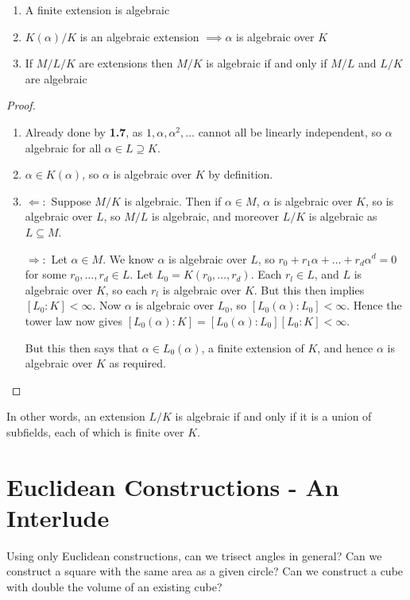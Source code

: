 \documentclass[10pt,a4paper]{article}
\begin{document}
\begin{proposition}
\item
\begin{enumerate}
\item A finite extension is algebraic
\item $K(\alpha) / K$ is an algebraic extension $\implies \alpha$ is algebraic over $K$
\item If $M/L/K$ are extensions then $M/K$ is algebraic if and only if $M/L$ and $L/K$ are algebraic
\end{enumerate}
\end{proposition}
\begin{proof}
\item
\begin{enumerate}
\item Already done by \textbf{1.7}, as $1, \alpha, \alpha^2, \ldots$ cannot all be linearly independent, so $\alpha$ algebraic for all $\alpha \in L \supseteq K$.
\item $\alpha \in K(\alpha)$, so $\alpha$ is algebraic over $K$ by definition.
\item $\Longleftarrow:$ Suppose $M/K$ is algebraic. Then if $\alpha\in M$, $\alpha$ is algebraic over $K$, so is algebraic over $L$, so $M/L$ is algebraic, and moreover $L/K$ is algebraic as $L\subseteq M$.

$\Longrightarrow:$ Let $\alpha\in M$. We know $\alpha$ is algebraic over $L$, so $r_0 + r_1\alpha+\ldots +r_d \alpha^d = 0$ for some $r_0, \ldots, r_d \in L$. Let $L_0 = K(r_0, \ldots, r_d)$. Each $r_l\in L$, and $L$ is algebraic over $K$, so each $r_l$ is algebraic over $K$. But this then implies $[L_0:K] <\infty$. Now $\alpha$ is algebraic over $L_0$, so $[L_0(\alpha):L_0] < \infty$. Hence the tower law now gives $[L_0(\alpha):K] = [L_0(\alpha):L_0][L_0:K] < \infty$.

But this then says that $\alpha \in L_0(\alpha)$, a finite extension of $K$, and hence $\alpha$ is algebraic over $K$ as required.
\end{enumerate}
\end{proof}
In other words, an extension $L/K$ is algebraic if and only if it is a union of subfields, each of which is finite over $K$.

\section{Euclidean Constructions - An Interlude}
Using only Euclidean constructions, can we trisect angles in general? Can we construct a square with the same area as a given circle? Can we construct a cube with double the volume of an existing cube?
\end{document}
